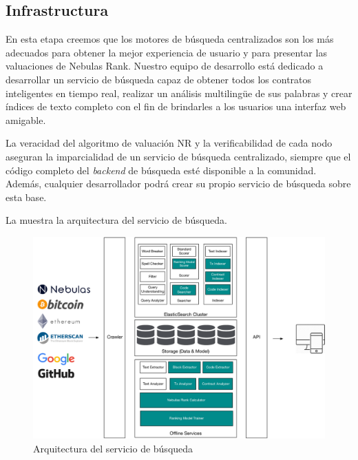 \subsection{Infrastructura}

En esta etapa creemos que los motores de búsqueda centralizados son los más adecuados para obtener la mejor experiencia de usuario y para presentar las valuaciones de Nebulas Rank. Nuestro equipo de desarrollo está dedicado a desarrollar un servicio de búsqueda capaz de obtener todos los contratos inteligentes en tiempo real, realizar un análisis multilingüe de sus palabras y crear índices de texto completo con el fin de brindarles a los usuarios una interfaz web amigable.

La veracidad del algoritmo de valuación NR y la verificabilidad de cada nodo aseguran la imparcialidad de un servicio de búsqueda centralizado, siempre que el código completo del \textit{backend} de búsqueda esté disponible a la comunidad. Además, cualquier desarrollador podrá crear su propio servicio de búsqueda sobre esta base.

La  muestra la arquitectura del servicio de búsqueda.

\begin{figure}[h]
\centering
\includegraphics[width=16cm]{./figs/search-arch-new}
\caption{Arquitectura del servicio de búsqueda}
\label{fig:search-arch}
\end{figure}

